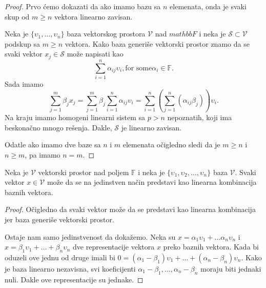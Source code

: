 \documentclass{article}
\begin{document}
\begin{proof}
  Prvo ćemo dokazati da ako imamo bazu sa $n$ elemenata, onda je svaki skup od $m \ge n$ vektora linearno zavisan.
  
  Neka je $\{\upsilon_1, \ldots, \upsilon_n\}$ baza vektorskog prostora $\mathcal{V}$ nad $mathbb{F}$ i neka je $\mathcal{S} \subset \mathcal{V}$ podskup sa $m \ge n$ vektora.
  Kako baza generiše vektorski prostor znamo da se svaki vektor $x_j \in \mathcal{S}$ može napisati kao
  \[\sum_{i = 1}^{n} \alpha_{ij} \upsilon_i, \text{for some} \alpha_i \in \mathbb{F}.\]
  Sada imamo
  \[\sum_{j = 1}^{m} \beta_j x_j = \sum_{j = 1}^{m} \beta_j \sum_{i = 1}^{n} \alpha_{ij} \upsilon_i = \sum_{i = 1}^{n} (\sum_{j = 1}^{n} (\alpha_{ij} \beta_j)) \upsilon_i.\]
  Na kraju imamo homogeni linearni sistem sa $p > n$ nepoznatih, koji ima beskonačno mnogo rešenja.
  Dakle, $\mathcal{S}$ je linearno zavisan.

  Odatle ako imamo dve baze sa $n$ i $m$ elemenata očigledno sledi da je $m \ge n$ i $n \ge m$, pa imamo $n = m$.
\end{proof}

\begin{theorem}
  Neka je $\mathcal{V}$ vektorski prostor nad poljem $\mathbb{F}$ i neka je $\{\upsilon_1, \upsilon_2, \ldots, \upsilon_n\}$ baza $\mathcal{V}$.
  Svaki vektor $x \in \mathcal{V}$ može da se na jedinstven način predstavi kao linearna kombinacija baznih vektora.
\end{theorem}

\begin{proof}
  Očigledno da svaki vektor može da se predstavi kao linearna kombinacija jer baza generiše vektorski prostor.

  Ostaje nam samo jedinstvenost da dokažemo.
  Neka su $x = \alpha_1 \upsilon_1 + \ldots \alpha_n \upsilon_n$ i $x = \beta_1 \upsilon_1 + \ldots + \beta_n \upsilon_n$ dve representacije vektora $x$ preko baznih vektora.
  Kada bi oduzeli ove jednu od druge imali bi $0 = (\alpha_1 - \beta_1) \upsilon_1 + \ldots + (\alpha_n - \beta_n) \upsilon_n$.
  Kako je baza linearno nezavisna, svi koeficijenti $\alpha_1 - \beta_1, \ldots, \alpha_n - \beta_n$ moraju biti jednaki nuli.
  Dakle ove representacije su jednake.
\end{proof}
\end{document}

